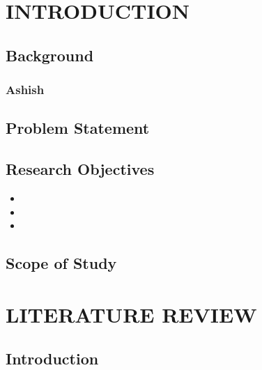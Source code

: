 \documentclass{SOICTthesis}  %
\begin{document}
\theabstract{
    \lipsum[1-2]  %
}


\chapter{INTRODUCTION}
\section{Background}
\lipsum[3-5]  %
\cite{b1, b3}

\subsection{Ashish}
\lipsum[3-5]  %

\section{Problem Statement}
\lipsum[6-7]
\cite{b2}

\section{Research Objectives}
\begin{itemize}
    \item \lipsum[8]
    \item \lipsum[9]
    \item \lipsum[10]
\end{itemize}

\section{Scope of Study}
\lipsum[11-12]

\chapter{LITERATURE REVIEW}
\section{Introduction}
\lipsum[13-15]
\cite{b5, b7}
\end{document}

